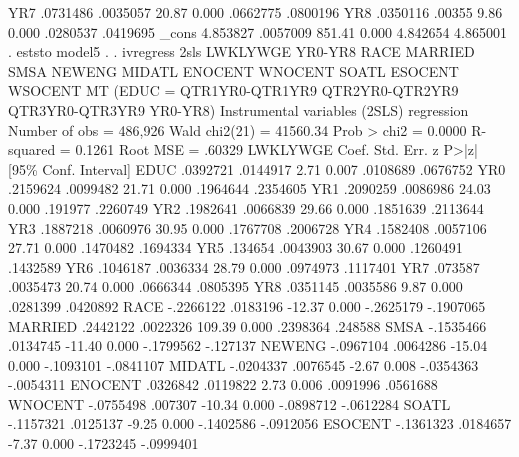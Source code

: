          YR7 {\VBAR}   .0731486   .0035057    20.87   0.000     .0662775    .0800196
         YR8 {\VBAR}   .0350116     .00355     9.86   0.000     .0280537    .0419695
       _cons {\VBAR}   4.853827   .0057009   851.41   0.000     4.842654    4.865001
{\smallskip}
. eststo model5
{\smallskip}
. 
. ivregress 2sls LWKLYWGE YR0-YR8 RACE MARRIED SMSA NEWENG MIDATL ENOCENT WNOCENT SOATL ESOCENT WSOCENT MT  (EDUC = QTR1YR0-QTR1YR9 QTR2YR0-QTR2YR9 QTR3YR0-QTR3YR9 YR0-YR8)
{\smallskip}
Instrumental variables (2SLS) regression          Number of obs   =    486,926
                                                  Wald chi2(21)   =   41560.34
                                                  Prob > chi2     =     0.0000
                                                  R-squared       =     0.1261
                                                  Root MSE        =     .60329
{\smallskip}
    LWKLYWGE {\VBAR}      Coef.   Std. Err.      z    P>|z|     [95\% Conf. Interval]
        EDUC {\VBAR}   .0392721   .0144917     2.71   0.007     .0108689    .0676752
         YR0 {\VBAR}   .2159624   .0099482    21.71   0.000     .1964644    .2354605
         YR1 {\VBAR}   .2090259   .0086986    24.03   0.000      .191977    .2260749
         YR2 {\VBAR}   .1982641   .0066839    29.66   0.000     .1851639    .2113644
         YR3 {\VBAR}   .1887218   .0060976    30.95   0.000     .1767708    .2006728
         YR4 {\VBAR}   .1582408   .0057106    27.71   0.000     .1470482    .1694334
         YR5 {\VBAR}    .134654   .0043903    30.67   0.000     .1260491    .1432589
         YR6 {\VBAR}   .1046187   .0036334    28.79   0.000     .0974973    .1117401
         YR7 {\VBAR}    .073587   .0035473    20.74   0.000     .0666344    .0805395
         YR8 {\VBAR}   .0351145   .0035586     9.87   0.000     .0281399    .0420892
        RACE {\VBAR}  -.2266122   .0183196   -12.37   0.000    -.2625179   -.1907065
     MARRIED {\VBAR}   .2442122   .0022326   109.39   0.000     .2398364     .248588
        SMSA {\VBAR}  -.1535466   .0134745   -11.40   0.000    -.1799562    -.127137
      NEWENG {\VBAR}  -.0967104   .0064286   -15.04   0.000    -.1093101   -.0841107
      MIDATL {\VBAR}  -.0204337   .0076545    -2.67   0.008    -.0354363   -.0054311
     ENOCENT {\VBAR}   .0326842   .0119822     2.73   0.006     .0091996    .0561688
     WNOCENT {\VBAR}  -.0755498    .007307   -10.34   0.000    -.0898712   -.0612284
       SOATL {\VBAR}  -.1157321   .0125137    -9.25   0.000    -.1402586   -.0912056
     ESOCENT {\VBAR}  -.1361323   .0184657    -7.37   0.000    -.1723245   -.0999401
